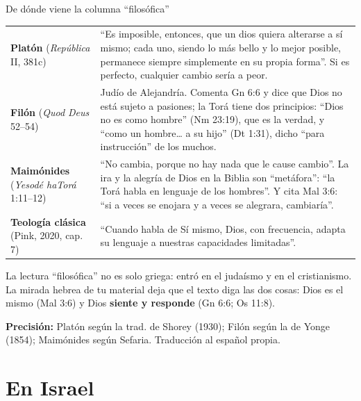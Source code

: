 \documentclass[hyperref={bookmarks=false},aspectratio=169]{beamer}
\newcommand{\destacar}[1]{\textbf{\textcolor{azul}{#1}}}
\newcommand{\precision}[1]{{\footnotesize\color{gris}\textbf{Precisión:} #1}}
\begin{document}
\begin{frame}{De dónde viene la columna ``filosófica''}
\scriptsize\renewcommand{\arraystretch}{1.18}
\begin{tabular}{@{}>{\RaggedRight\arraybackslash}p{2.6cm}>{\RaggedRight\arraybackslash}p{9.2cm}@{}}
\toprule
\textbf{Platón} (\emph{República} II, 381c) & ``Es imposible, entonces, que un dios quiera alterarse a sí mismo; cada uno, siendo lo más bello y lo mejor posible, permanece siempre simplemente en su propia forma''. Si es perfecto, cualquier cambio sería a peor. \\
\textbf{Filón} (\emph{Quod Deus} 52--54) & Judío de Alejandría. Comenta Gn 6:6 y dice que Dios no está sujeto a pasiones; la Torá tiene dos principios: ``Dios no es como hombre'' (Nm 23:19), que es la verdad, y ``como un hombre\ldots{} a su hijo'' (Dt 1:31), dicho ``para instrucción'' de los muchos. \\
\textbf{Maimónides} (\emph{Yesodé haTorá} 1:11--12) & ``No cambia, porque no hay nada que le cause cambio''. La ira y la alegría de Dios en la Biblia son ``metáfora'': ``la Torá habla en lenguaje de los hombres''. Y cita Mal 3:6: ``si a veces se enojara y a veces se alegrara, cambiaría''. \\
\textbf{Teología clásica} (Pink, 2020, cap. 7) & ``Cuando habla de Sí mismo, Dios, con frecuencia, adapta su lenguaje a nuestras capacidades limitadas''. \\
\bottomrule
\end{tabular}\par\medskip
\small\RaggedRight La lectura ``filosófica'' no es solo griega: entró en el judaísmo y en el cristianismo. La mirada hebrea de tu material deja que el texto diga las dos cosas: Dios es el mismo (Mal 3:6) y Dios \destacar{siente y responde} (Gn 6:6; Os 11:8).\par\smallskip
\precision{Platón según la trad. de Shorey (1930); Filón según la de Yonge (1854); Maimónides según Sefaria. Traducción al español propia.}
\end{frame}

\section{En Israel}
\end{document}
